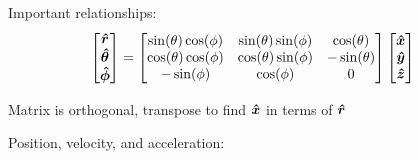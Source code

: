     Important relationships:
    \begin{align*}
        \begin{bmatrix}
        \e{r}\\
        \e{\theta}\\
        \e{\phi}
        \end{bmatrix}
        &=
        \begin{bmatrix}
        \sin(\theta)\cos(\phi)&\sin(\theta)\sin(\phi)&\cos(\theta)\\
        \cos(\theta)\cos(\phi)&\cos(\theta)\sin(\phi)&-\sin(\theta)\\
        -\sin(\phi)&\cos(\phi)&0
        \end{bmatrix}
        \begin{bmatrix}
        \e{x}\\
        \e{y}\\
        \e{z}
        \end{bmatrix}
    \end{align*}
    \begin{center}
    Matrix is orthogonal, transpose to find $\e{x}$ in terms of $\e{r}$
    \end{center}
    \vspace{0.5 cm}
    Position, velocity, and acceleration:

